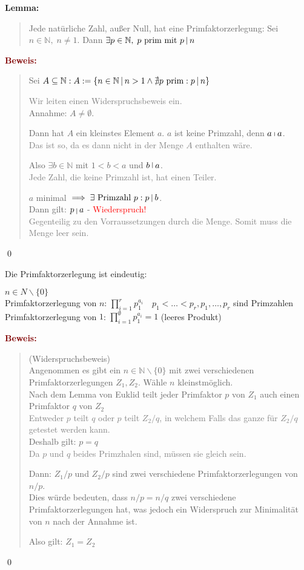 \documentclass{article}
\newcommand{\smsp}{\phantom{\hspace{3px}}}
\newcommand{\red}[1]{\textcolor{red}{#1}}
\newcommand{\gray}[1]{\textcolor{gray}{#1}}
\newcommand{\dgr}[1]{\textcolor{dgr}{#1}}
\newcommand{\maroon}[1]{\textcolor{maroon}{#1}}
\newcommand{\lem}[1]{\dgr{\textbf{Lemma: }}\begin{quote}#1\end{quote}}
\newcommand{\pr}[1]{\maroon{\textbf{Beweis: }}\begin{quote}#1\end{quote}\qed}
\newcommand{\N}{\mathbb{N}}
\newcommand{\vst}{\smsp \vline \smsp}
\begin{document}
\lem{Jede natürliche Zahl, außer Null, hat eine Primfaktorzerlegung: Sei $n \in \N, \; n \neq 1$. Dann $\exists p \in \N, \; p \text{ prim mit } p \vst n$}
\newpage
\pr{
    Sei $A \subseteq \N: A:= \{n \in \N \vst n > 1 \land \nexists p \text{ prim}: p \vst n\}$

    \gray{Wir leiten einen Widerspruchsbeweis ein.}\\
    Annahme: $A \neq \emptyset$.

    Dann hat $A$ ein kleinstes Element $a$. $a$ ist keine Primzahl, denn $a \vst a$.\\
    \gray{Das ist so, da es dann nicht in der Menge $A$ enthalten wäre.}

    Also $\exists b \in \N$ mit $1 < b < a$ und $b \vst a$.\\
    \gray{Jede Zahl, die keine Primzahl ist, hat einen Teiler.}

    $a$ minimal $\implies \exists \text{ Primzahl } p: p \vst b$.\\
    Dann gilt: $p \vst a$ - \red{Wiederspruch!}\\
    \gray{Gegenteilig zu den Vorraussetzungen durch die Menge. Somit muss die Menge leer sein.}
}

Die Primfaktorzerlegung ist eindeutig:

$n \in N \backslash \{0\}$\\
Primfaktorzerlegung von $n$: $\prod_{i = 1}^{r}p_1^{a_i} \quad p_1 < \dots < p_r, p_1, \dots, p_r$ sind Primzahlen\\
Primfaktorzerlegung von $1$: $\prod_{i = 1}^{\emptyset}p_1^{a_i} = 1$ (leeres Produkt)

\pr{
    (Widerspruchsbeweis)\\
    Angenommen es gibt ein $n \in \N \backslash \{0\}$ mit zwei verschiedenen Primfaktorzerlegungen $Z_1, Z_2$. Wähle $n$ kleinstmöglich.\\
    Nach dem Lemma von Euklid teilt jeder Primfaktor $p$ von $Z_1$ auch einen Primfaktor $q$ von $Z_2$\\
    \gray{Entweder $p$ teilt $q$ oder $p$ teilt $Z_2/q$, in welchem Falls das ganze für $Z_2/q$ getestet werden kann.}\\
    Deshalb gilt: $p=q$\\
    \gray{Da $p$ und $q$ beides Primzhalen sind, müssen sie gleich sein.}

    Dann: $Z_1/p$ und $Z_2/p$ sind zwei verschiedene Primfaktorzerlegungen von $n/p$.\\
    Dies würde bedeuten, dass $n/p = n/q$ zwei verschiedene Primfaktorzerlegungen hat, was jedoch ein Widerspruch zur Minimalität von $n$ nach der Annahme ist.

    Also gilt: $Z_1 = Z_2$
}
\end{document}
